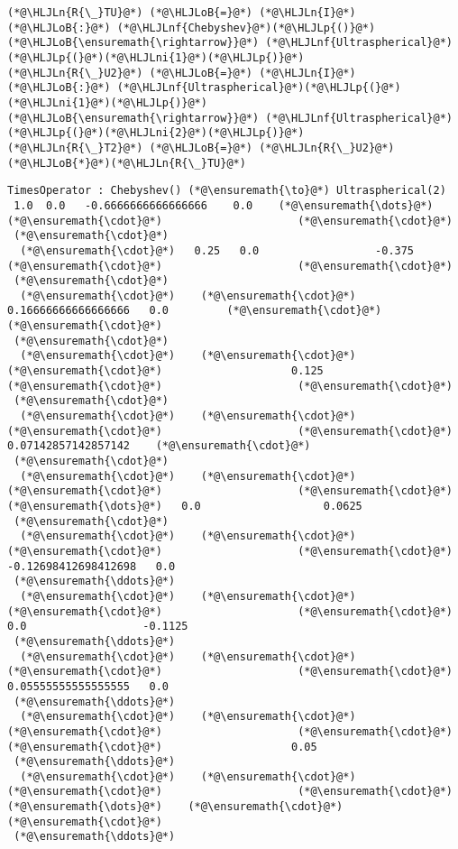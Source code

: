 \documentclass[12pt,landscape]{article}
\newcommand{\HLJLn}[1]{#1}
\newcommand{\HLJLnf}[1]{\textcolor[RGB]{66,102,213}{#1}}
\newcommand{\HLJLni}[1]{\textcolor[RGB]{59,151,46}{#1}}
\newcommand{\HLJLoB}[1]{\textcolor[RGB]{102,102,102}{\textbf{#1}}}
\newcommand{\HLJLp}[1]{#1}
\begin{document}
{\begin{lstlisting}
(*@\HLJLn{R{\_}TU}@*) (*@\HLJLoB{=}@*) (*@\HLJLn{I}@*) (*@\HLJLoB{:}@*) (*@\HLJLnf{Chebyshev}@*)(*@\HLJLp{()}@*) (*@\HLJLoB{\ensuremath{\rightarrow}}@*) (*@\HLJLnf{Ultraspherical}@*)(*@\HLJLp{(}@*)(*@\HLJLni{1}@*)(*@\HLJLp{)}@*)
(*@\HLJLn{R{\_}U2}@*) (*@\HLJLoB{=}@*) (*@\HLJLn{I}@*) (*@\HLJLoB{:}@*) (*@\HLJLnf{Ultraspherical}@*)(*@\HLJLp{(}@*)(*@\HLJLni{1}@*)(*@\HLJLp{)}@*) (*@\HLJLoB{\ensuremath{\rightarrow}}@*) (*@\HLJLnf{Ultraspherical}@*)(*@\HLJLp{(}@*)(*@\HLJLni{2}@*)(*@\HLJLp{)}@*)
(*@\HLJLn{R{\_}T2}@*) (*@\HLJLoB{=}@*) (*@\HLJLn{R{\_}U2}@*)(*@\HLJLoB{*}@*)(*@\HLJLn{R{\_}TU}@*)
\end{lstlisting}
{\Large
\begin{lstlisting}
TimesOperator : Chebyshev() (*@\ensuremath{\to}@*) Ultraspherical(2)
 1.0  0.0   -0.6666666666666666    0.0    (*@\ensuremath{\dots}@*)    (*@\ensuremath{\cdot}@*)                     (*@\ensuremath{\cdot}@*)     
 (*@\ensuremath{\cdot}@*)
  (*@\ensuremath{\cdot}@*)   0.25   0.0                  -0.375       (*@\ensuremath{\cdot}@*)                     (*@\ensuremath{\cdot}@*)     
 (*@\ensuremath{\cdot}@*)
  (*@\ensuremath{\cdot}@*)    (*@\ensuremath{\cdot}@*)     0.16666666666666666   0.0         (*@\ensuremath{\cdot}@*)                     (*@\ensuremath{\cdot}@*)     
 (*@\ensuremath{\cdot}@*)
  (*@\ensuremath{\cdot}@*)    (*@\ensuremath{\cdot}@*)      (*@\ensuremath{\cdot}@*)                    0.125       (*@\ensuremath{\cdot}@*)                     (*@\ensuremath{\cdot}@*)     
 (*@\ensuremath{\cdot}@*)
  (*@\ensuremath{\cdot}@*)    (*@\ensuremath{\cdot}@*)      (*@\ensuremath{\cdot}@*)                     (*@\ensuremath{\cdot}@*)         0.07142857142857142    (*@\ensuremath{\cdot}@*)     
 (*@\ensuremath{\cdot}@*)
  (*@\ensuremath{\cdot}@*)    (*@\ensuremath{\cdot}@*)      (*@\ensuremath{\cdot}@*)                     (*@\ensuremath{\cdot}@*)     (*@\ensuremath{\dots}@*)   0.0                   0.0625 
 (*@\ensuremath{\cdot}@*)
  (*@\ensuremath{\cdot}@*)    (*@\ensuremath{\cdot}@*)      (*@\ensuremath{\cdot}@*)                     (*@\ensuremath{\cdot}@*)        -0.12698412698412698   0.0    
 (*@\ensuremath{\ddots}@*)
  (*@\ensuremath{\cdot}@*)    (*@\ensuremath{\cdot}@*)      (*@\ensuremath{\cdot}@*)                     (*@\ensuremath{\cdot}@*)         0.0                  -0.1125 
 (*@\ensuremath{\ddots}@*)
  (*@\ensuremath{\cdot}@*)    (*@\ensuremath{\cdot}@*)      (*@\ensuremath{\cdot}@*)                     (*@\ensuremath{\cdot}@*)         0.05555555555555555   0.0    
 (*@\ensuremath{\ddots}@*)
  (*@\ensuremath{\cdot}@*)    (*@\ensuremath{\cdot}@*)      (*@\ensuremath{\cdot}@*)                     (*@\ensuremath{\cdot}@*)          (*@\ensuremath{\cdot}@*)                    0.05   
 (*@\ensuremath{\ddots}@*)
  (*@\ensuremath{\cdot}@*)    (*@\ensuremath{\cdot}@*)      (*@\ensuremath{\cdot}@*)                     (*@\ensuremath{\cdot}@*)     (*@\ensuremath{\dots}@*)    (*@\ensuremath{\cdot}@*)                     (*@\ensuremath{\cdot}@*)     
 (*@\ensuremath{\ddots}@*)
\end{lstlisting}}


}
\end{document}
